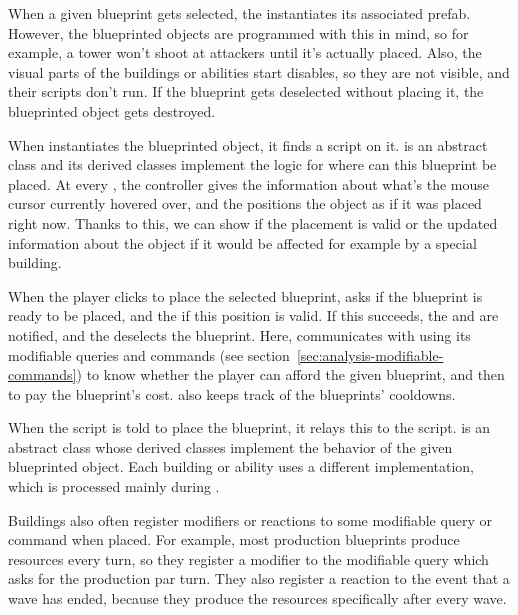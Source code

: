 

When a given blueprint gets selected, the  instantiates its associated prefab.
However, the blueprinted objects are programmed with this in mind, so for example, a tower won't shoot at attackers until it's actually placed.
Also, the visual parts of the buildings or abilities start disables, so they are not visible, and their scripts don't run.
If the blueprint gets deselected without placing it, the blueprinted object gets destroyed.

When  instantiates the blueprinted object, it finds a  script on it.
 is an abstract class and its derived classes implement the logic for where can this blueprint be placed.
At every , the  controller gives the  information about what's the mouse cursor currently hovered over, and the  positions the object as if it was placed right now.
Thanks to this, we can show if the placement is valid or the updated information about the object if it would be affected for example by a special building.

When the player clicks to place the selected blueprint,  asks  if the blueprint is ready to be placed, and the  if this position is valid.
If this succeeds, the  and  are notified, and the  deselects the blueprint.
Here,  communicates with  using its modifiable queries and commands (see section~\ref{sec:analysis-modifiable-commands}) to know whether the player can afford the given blueprint, and then to pay the blueprint's cost.
 also keeps track of the blueprints' cooldowns.

When the  script is told to place the blueprint, it relays this to the  script.
 is an abstract class whose derived classes implement the behavior of the given blueprinted object.
Each building or ability uses a different implementation, which is processed mainly during .

Buildings also often register modifiers or reactions to some modifiable query or command when placed.
For example, most production blueprints produce resources every turn, so they register a modifier to the modifiable query which asks for the production par turn.
They also register a reaction to the event that a wave has ended, because they produce the resources specifically after every wave.

